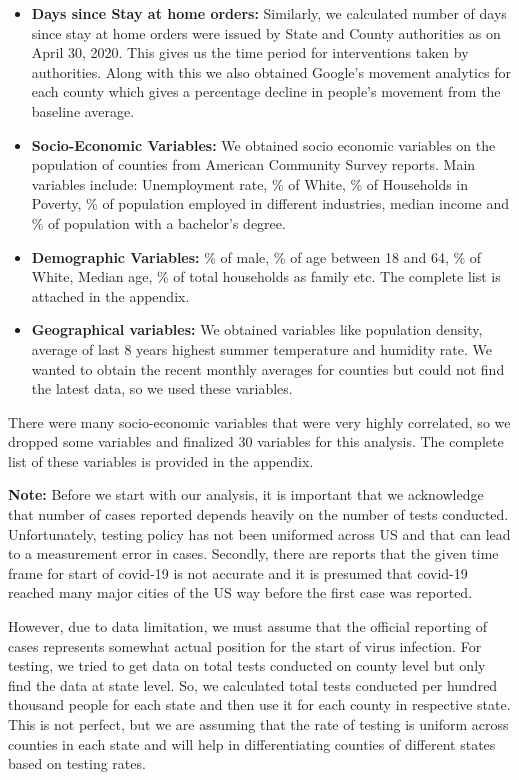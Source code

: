 \documentclass[
]{article}
\providecommand{\tightlist}{%
  \setlength{\itemsep}{0pt}\setlength{\parskip}{0pt}}
\begin{document}
\begin{itemize}
\tightlist
\item
  \textbf{Days since Stay at home orders:} Similarly, we calculated
  number of days since stay at home orders were issued by State and
  County authorities as on April 30, 2020. This gives us the time period
  for interventions taken by authorities. Along with this we also
  obtained Google's movement analytics for each county which gives a
  percentage decline in people's movement from the baseline average.
\item
  \textbf{Socio-Economic Variables:} We obtained socio economic
  variables on the population of counties from American Community Survey
  reports. Main variables include: Unemployment rate, \% of White, \% of
  Households in Poverty, \% of population employed in different
  industries, median income and \% of population with a bachelor's
  degree.\\
\item
  \textbf{Demographic Variables:} \% of male, \% of age between 18 and
  64, \% of White, Median age, \% of total households as family etc. The
  complete list is attached in the appendix.
\item
  \textbf{Geographical variables:} We obtained variables like population
  density, average of last 8 years highest summer temperature and
  humidity rate. We wanted to obtain the recent monthly averages for
  counties but could not find the latest data, so we used these
  variables.
\end{itemize}

There were many socio-economic variables that were very highly
correlated, so we dropped some variables and finalized 30 variables for
this analysis. The complete list of these variables is provided in the
appendix.

\textbf{Note:} Before we start with our analysis, it is important that
we acknowledge that number of cases reported depends heavily on the
number of tests conducted. Unfortunately, testing policy has not been
uniformed across US and that can lead to a measurement error in cases.
Secondly, there are reports that the given time frame for start of
covid-19 is not accurate and it is presumed that covid-19 reached many
major cities of the US way before the first case was reported.

However, due to data limitation, we must assume that the official
reporting of cases represents somewhat actual position for the start of
virus infection. For testing, we tried to get data on total tests
conducted on county level but only find the data at state level. So, we
calculated total tests conducted per hundred thousand people for each
state and then use it for each county in respective state. This is not
perfect, but we are assuming that the rate of testing is uniform across
counties in each state and will help in differentiating counties of
different states based on testing rates.
\end{document}
